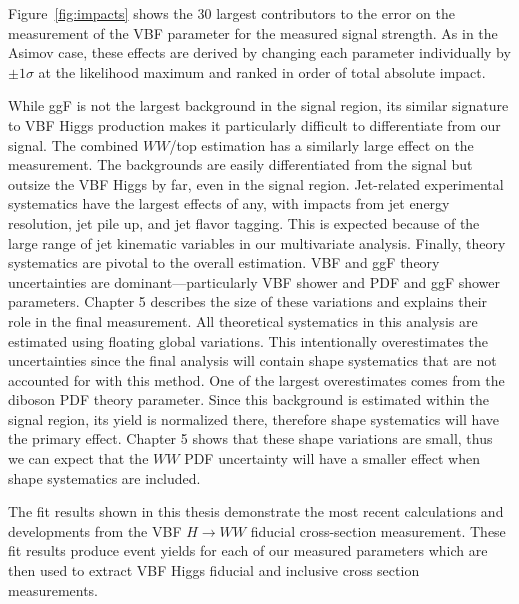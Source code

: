 Figure~\ref{fig:impacts} shows the 30 largest contributors to the error on the measurement of the VBF parameter for the measured signal strength. As in the Asimov case, these effects are derived by changing each parameter individually by $\pm 1\sigma$ at the likelihood maximum and ranked in order of total absolute impact.

While ggF is not the largest background in the signal region, its similar signature to VBF Higgs production makes it particularly difficult to differentiate from our signal. The combined $WW$/top estimation has a similarly large effect on the measurement. The backgrounds are easily differentiated from the signal but outsize the VBF Higgs by far, even in the signal region. Jet-related experimental systematics have the largest effects of any, with impacts from jet energy resolution, jet pile up, and jet flavor tagging. This is expected because of the large range of jet kinematic variables in our multivariate analysis. Finally, theory systematics are pivotal to the overall estimation. VBF and ggF theory uncertainties are dominant---particularly VBF shower and PDF and ggF shower parameters. Chapter 5 describes the size of these variations and explains their role in the final measurement. All theoretical systematics in this analysis are estimated using floating global variations. This intentionally overestimates the uncertainties since the final analysis will contain shape systematics that are not accounted for with this method. One of the largest overestimates comes from the diboson PDF theory parameter. Since this background is estimated within the signal region, its yield is normalized there, therefore shape systematics will have the primary effect. Chapter 5 shows that these shape variations are small, thus we can expect that the $WW$ PDF uncertainty will have a smaller effect when shape systematics are included. 

The fit results shown in this thesis demonstrate the most recent calculations and developments from the VBF $H\rightarrow WW$ fiducial cross-section measurement. These fit results produce event yields for each of our measured parameters which are then used to extract VBF Higgs fiducial and inclusive cross section measurements.

